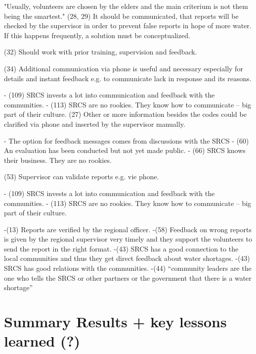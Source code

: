 
"Usually, volunteers are chosen by the elders and the main criterium is not them being the smartest."
(28, 29) It should be communicated, that reports will be checked by the supervisor in order to prevent false reports in hope of more water. If this happens frequently, a solution must be conceptualized.

(32) Should work with prior training, supervision and feedback.

(34) Additional communication via phone is useful and necessary especially for details and instant feedback e.g. to communicate lack in response and its reasons.

-	(109) SRCS invests a lot into communication and feedback with the communities.
-	(113) SRCS are no rookies. They know how to communicate – big part of their culture.
(27) Other or more information besides the codes could be clarified via phone and inserted by the supervisor manually.

-	The option for feedback messages comes from discussions with the SRCS
-	(60) An evaluation has been conducted but not yet made public.
-	(66) SRCS knows their business. They are no rookies.

(53) Supervisor can validate reports e.g. vie phone.

-	(109) SRCS invests a lot into communication and feedback with the communities.
-	(113) SRCS are no rookies. They know how to communicate – big part of their culture.



-(13) Reports are verified by the regional officer.
-(58) Feedback on wrong reports is given by the regional supervisor very timely and they support the volunteers to send the report in the right format.
-(43) SRCS has a good connection to the local communities and thus they get direct feedback about water shortages.
-(43) SRCS has good relations with the communities.
-(44) “community leaders are the one who tells the SRCS or other partners or the government that there is a water shortage”


\section{Summary Results + key lessons learned (?)}






